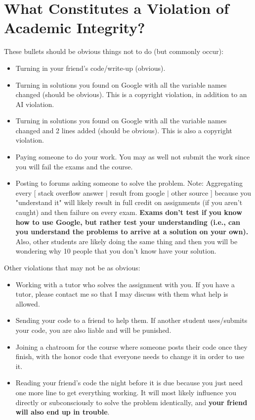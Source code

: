 \documentclass{article}
\begin{document}
\section{What Constitutes a Violation of Academic Integrity?}
These bullets should be obvious things not to do (but commonly occur):
\begin{itemize}
    \item Turning in your friend’s code/write-up (obvious).
    \item Turning in solutions you found on Google with all the variable names changed (should be obvious). This is a copyright violation, in addition to an AI violation.
    \item Turning in solutions you found on Google with all the variable names changed and 2 lines added (should be obvious). This is also a copyright violation.
    \item Paying someone to do your work. You may as well not submit the work since you will fail the exams and the course.
    \item Posting to forums asking someone to solve the problem. Note: Aggregating every [ stack overflow answer $\mid$ result from google $\mid$ other source ] because you "understand it" will likely result in full credit on assignments (if you aren't caught) and then failure on every exam. \textbf{Exams don't test if you know how to use Google, but rather test your understanding (i.e., can you understand the problems to arrive at a solution on your own).} Also, other students are likely doing the same thing and then you will be wondering why 10 people that you don’t know have your solution.
\end{itemize}
Other violations that may not be as obvious:
\begin{itemize}
    \item Working with a tutor who solves the assignment with you. If you have a tutor, please contact me so that I may discuss with them what help is allowed.
    \item Sending your code to a friend to help them. If another student uses/submits your code, you are also liable and will be punished.
    \item Joining a chatroom for the course where someone posts their code once they finish, with the honor code that everyone needs to change it in order to use it.
    \item Reading your friend’s code the night before it is due because you just need one more line to get everything working. It will most likely influence you directly or subconsciously to solve the problem identically, and \textbf{your friend will also end up in trouble}.
\end{itemize}
\end{document}
